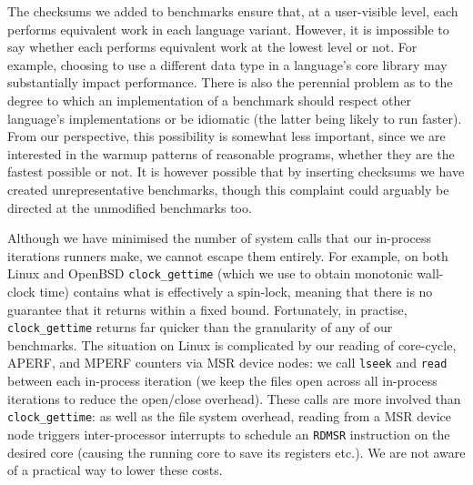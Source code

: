 \documentclass[acmsmall]{acmart}\settopmatter{printfolios=true}
\begin{document}
The checksums we added to benchmarks ensure that, at a user-visible level, each
performs equivalent work in each language variant. However, it is impossible to
say whether each performs equivalent work at the lowest level or not. For
example, choosing to use a different data type in a language's core library may
substantially impact performance. There is also the perennial problem as to the
degree to which an implementation of a benchmark should respect other
language's implementations or be idiomatic (the latter being likely to
run faster). From our perspective, this possibility is somewhat less important,
since we are interested in the warmup patterns of reasonable programs,
whether they are the fastest possible or not. It is however possible that by
inserting checksums we have created unrepresentative benchmarks, though
this complaint could arguably be directed at the unmodified benchmarks too.

Although we have minimised the number of system calls that our in-process
iterations runners make, we cannot escape them entirely. For example,
on both Linux and OpenBSD \texttt{clock\_gettime} (which we use to obtain
monotonic wall-clock time) contains what is effectively a spin-lock,
meaning that there is no guarantee that it returns within a fixed bound.
Fortunately, in practise, \texttt{clock\_gettime} returns far quicker than the granularity
of any of our benchmarks. \label{aperf/mperf error} The situation
on Linux is complicated by our reading of core-cycle, APERF, and MPERF
counters via MSR device nodes: we call \texttt{lseek} and \texttt{read}
between each in-process iteration (we keep the files open across all
in-process iterations to reduce the open/close overhead).
These calls are more involved than \texttt{clock\_gettime}:
as well as the file system overhead, reading from a MSR device
node triggers inter-processor interrupts to schedule an \texttt{RDMSR}
instruction on the desired core (causing the running core to save its registers etc.).
We are not aware of a practical way to lower these costs.
\end{document}
